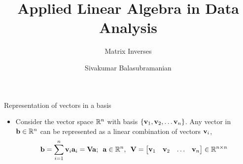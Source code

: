 \documentclass[aspectratio=169]{beamer}
\title{Applied Linear Algebra in Data Analysis}
\subtitle{Matrix Inverses}
\author{Sivakumar Balasubramanian}
\institute[Christian Medical College] %
{
  \inst{}%
  Department of Bioengineering\\
  Christian Medical College, Bagayam\\
  Vellore 632002
}
\date{}
\let\olditem\item
\renewcommand{\item}{\setlength{\itemsep}{\fill}\olditem}
\def\mf{\ensuremath\mathbf}
\def\mb{\ensuremath\mathbb}
\begin{document}
\begin{frame}
  \titlepage
\end{frame}



\begin{frame}[t]{Representation of vectors in a basis}
\begin{itemize}
\item Consider the vector space $\mb{R}^n$ with basis $\left\{\mf{v}_1, \mf{v}_2, \ldots \mf{v}_n\right\}$. Any vector in $\mf{b} \in \mb{R}^n$ can be represented as a linear combination of vectors $\mf{v}_i$,
\[ \mf{b} = \sum_{i=1}^{n} \mf{v}_i\mf{a}_i = \mf{V}\mf{a}; \,\,\, \mf{a} \in \mb{R}^n, \,\,\, \mf{V} = \begin{bmatrix*}\mf{v}_1 & \mf{v}_2 & \ldots & \mf{v}_n\end{bmatrix*} \in \mb{R}^{n \times n} \]


\end{itemize}
\end{frame}
\end{document}
